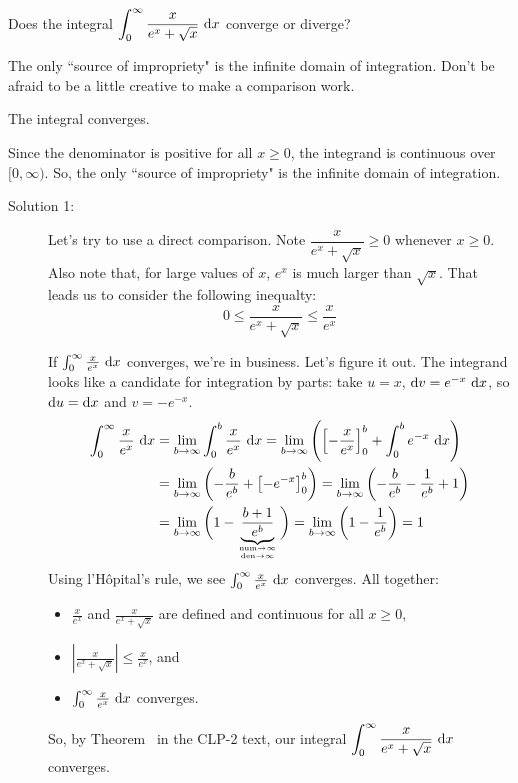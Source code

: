 \begin{Mquestion}
Does the integral $\displaystyle\int_0^\infty \frac{x}{e^x+\sqrt{x}} ~\mathrm{d}x$ converge or diverge?
\end{Mquestion}
\begin{hint}
The only ``source of impropriety" is the infinite domain of integration.
Don't be afraid to be a little creative to make a comparison work.
\end{hint}
\begin{answer}
The integral converges.
\end{answer}
\begin{solution}
Since the denominator is positive for all $x \geq 0$, the integrand is continuous over $[0, \infty)$. So, the only ``source of impropriety" is the infinite domain of integration.

\begin{description}
\item[Solution 1:] Let's try to use a direct comparison. Note $\dfrac{x}{e^x + \sqrt{x}} \geq 0$ whenever $x \geq 0$. Also note that, for large values of $x$, $e^x$ is much larger than $\sqrt{x}$. That leads us to consider the following inequalty:
\[
0\leq \dfrac{x}{e^x + \sqrt{x}}  \leq \dfrac{x}{e^x }\]

If $\int_0^\infty \frac{x}{e^x}~\mathrm{d}x$ converges, we're in business. Let's figure it out. The integrand looks like a candidate for integration by parts: take $u=x$, $\mathrm{d}v = e^{-x}~\mathrm{d}x$, so $\mathrm{d}u=\mathrm{d}x$ and $v=-e^{-x}$.
\begin{align*}
\int_0^\infty \frac{x}{e^x}~\dee{x}&=\lim_{b \to \infty}\int_0^b \frac{x}{e^x}~\dee{x}=
\lim_{b \to \infty}\left( \left[-\frac{x}{e^x}\right]_0^b + \int_0^b e^{-x}~\dee{x} \right)\\&=
\lim_{b \to \infty}\left(-\frac{b}{e^b} +\left[-e^{-x}\right]_0^b \right)=
\lim_{b \to \infty}\left(-\frac{b}{e^b} -\frac{1}{e^b}+1 \right)\\&=
\lim_{b \to \infty}\bigg(1-\underbrace{\frac{b+1}{e^b}}_{\atp{\mathrm{num}\to\infty}{\mathrm{den}\to\infty}}  \bigg)=\lim_{b \to \infty}\bigg(1-\frac{1}{e^b} \bigg)=1
\end{align*}
Using l'H\^{o}pital's rule, we see $\int_0^\infty \frac{x}{e^x}~\mathrm{d}x$ converges.  All together:
\begin{itemize}
\item $\frac{x}{e^x}$ and $\frac{x}{e^x+\sqrt{x}}$ are defined and continuous for all $x \geq 0$,
\item $\left|\frac{x}{e^x+\sqrt{x}}\right|\leq \frac{x}{e^x}$, and
\item $\int_0^\infty \frac{x}{e^x}~\mathrm{d}x$ converges.
\end{itemize}
So, by Theorem~ in the CLP-2 text, our integral $\displaystyle\int_0^\infty \frac{x}{e^x+\sqrt{x}} ~\mathrm{d}x$ converges.


\end{description}
\end{solution}
